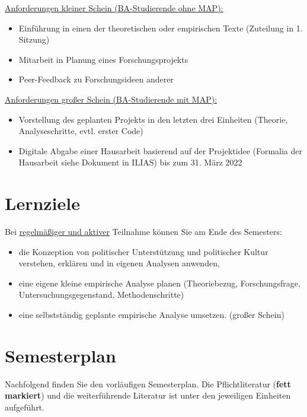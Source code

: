 \documentclass[11pt,a4paper]{article}
\begin{document}
\underline{Anforderungen kleiner Schein (BA-Studierende ohne MAP):}
\begin{itemize}
	\item Einführung in einen der theoretischen oder empirischen Texte (Zuteilung in 1. Sitzung)
	\item Mitarbeit in Planung eines Forschungsprojekts
	\item Peer-Feedback zu Forschungsideen anderer 
\end{itemize}
	
\underline{Anforderungen großer Schein (BA-Studierende mit MAP):}
\begin{itemize}
	\item Vorstellung des geplanten Projekts in den letzten drei Einheiten (Theorie, Analyseschritte, evtl. erster Code)
	\item Digitale Abgabe einer Hausarbeit basierend auf der Projektidee (Formalia der Hausarbeit siehe Dokument in ILIAS) bis zum 31. März 2022
\end{itemize}

\section*{Lernziele}
Bei \underline{regelmäßiger und aktiver} Teilnahme können Sie am Ende des Semesters: 
\begin{itemize}
	\item die Konzeption von politischer Unterstützung und politischer Kultur verstehen, erklären und in eigenen Analysen anwenden,
	\item eine eigene kleine empirische Analyse planen (Theoriebezug, Forschungsfrage, Untersuchungsgegenstand, Methodenschritte)
	\item eine selbstständig geplante empirische Analyse umsetzen. (großer Schein)
\end{itemize}

\section*{Semesterplan}
Nachfolgend finden Sie den vorläufigen Semesterplan. Die Pflichtliteratur (\textbf{fett markiert}) und die weiterführende Literatur ist unter den jeweiligen Einheiten aufgeführt.
\end{document}
